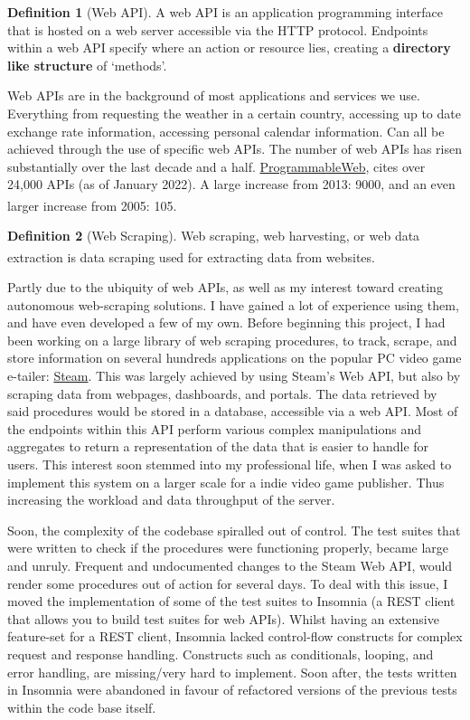 \documentclass[]{full}
\theoremstyle{definition}
\newtheorem{definition}{Definition}[subsubsection]
\begin{document}
\begin{definition}[Web API]
    A web API is an application programming interface that is hosted on a web server accessible via the HTTP protocol. Endpoints within a web API specify where an action or resource lies, creating a \textbf{directory like structure} of `methods'.
\end{definition}

Web APIs are in the background of most applications and services we use. Everything from requesting the weather in a certain country, accessing up to date exchange rate information, accessing personal calendar information. Can all be achieved through the use of specific web APIs. The number of web APIs has risen substantially over the last decade and a half. \href{https://www.programmableweb.com/category/all/apis}{ProgrammableWeb}, cites over 24,000 APIs (as of January 2022). A large increase from 2013: 9000, and an even larger increase from 2005: 105\textsuperscript{\cite{duvander_2013}}.

\begin{definition}[Web Scraping]
    Web scraping, web harvesting, or web data extraction is data scraping used for extracting data from websites\textsuperscript{\cite{web_scraping_wikipedia_2022}}.
\end{definition}

Partly due to the ubiquity of web APIs, as well as my interest toward creating autonomous web-scraping solutions. I have gained a lot of experience using them, and have even developed a few of my own. Before beginning this project, I had been working on a large library of web scraping procedures, to track, scrape, and store information on several hundreds applications on the popular PC video game e-tailer: \href{https://store.steampowered.com/}{Steam}. This was largely achieved by using Steam's Web API, but also by scraping data from webpages, dashboards, and portals. The data retrieved by said procedures would be stored in a database, accessible via a web API. Most of the endpoints within this API perform various complex manipulations and aggregates to return a representation of the data that is easier to handle for users. This interest soon stemmed into my professional life, when I was asked to implement this system on a larger scale for a indie video game publisher. Thus increasing the workload and data throughput of the server.

Soon, the complexity of the codebase spiralled out of control. The test suites that were written to check if the procedures were functioning properly, became large and unruly. Frequent and undocumented changes to the Steam Web API, would render some procedures out of action for several days. To deal with this issue, I moved the implementation of some of the test suites to Insomnia (a REST client that allows you to build test suites for web APIs). Whilst having an extensive feature-set for a REST client, Insomnia lacked control-flow constructs for complex request and response handling. Constructs such as conditionals, looping, and error handling, are missing/very hard to implement. Soon after, the tests written in Insomnia were abandoned in favour of refactored versions of the previous tests within the code base itself.
\end{document}
